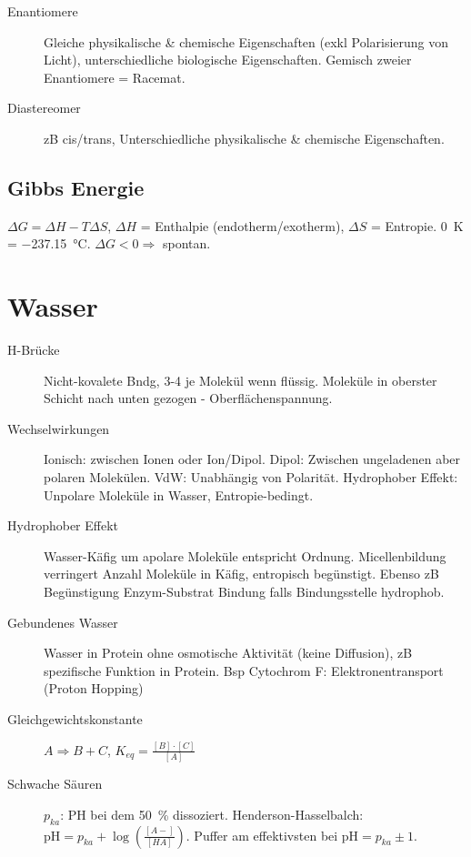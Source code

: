 \documentclass[a4paper,twocolumn,usegeometry,english,fontsize=6,DIV=16]{scrartcl}
\begin{document}
\begin{description}
	\item[Enantiomere] Gleiche physikalische \& chemische Eigenschaften
		(exkl Polarisierung von Licht), unterschiedliche biologische
		Eigenschaften. Gemisch zweier Enantiomere = Racemat.
	\item[Diastereomer] zB cis/trans, Unterschiedliche physikalische \&
		chemische Eigenschaften.
\end{description}

\subsection{Gibbs Energie}

$\Delta G = \Delta H - T \Delta S$, $\Delta H$ = Enthalpie
(endotherm/exotherm), $\Delta S$ = Entropie. \SI{0}{\kelvin} =
\SI{-237.15}{\celsius}. $\Delta G < 0 \Rightarrow$ spontan.

\section{Wasser}

\begin{description}
	\item[H-Brücke] Nicht-kovalete Bndg, 3-4 je  Molekül wenn
		flüssig. Moleküle in oberster Schicht nach unten gezogen -
		Oberflächenspannung.
	\item[Wechselwirkungen] Ionisch: zwischen Ionen oder Ion/Dipol. Dipol:
		Zwischen ungeladenen aber polaren Molekülen. VdW: Unabhängig
		von Polarität. Hydrophober Effekt: Unpolare Moleküle in Wasser,
		Entropie-bedingt.
	\item[Hydrophober Effekt] Wasser-Käfig um apolare Moleküle entspricht
		Ordnung. Micellenbildung verringert Anzahl Moleküle in Käfig,
		entropisch begünstigt. Ebenso zB Begünstigung Enzym-Substrat
		Bindung falls Bindungsstelle hydrophob.
	\item[Gebundenes Wasser] Wasser in Protein ohne osmotische Aktivität
		(keine Diffusion), zB spezifische Funktion in Protein. Bsp
		Cytochrom F: Elektronentransport (Proton Hopping)
	\item[Gleichgewichtskonstante] $A \Rightarrow B + C$, $K_{eq} =
		\frac{[B] \cdot [C]}{[A]}$
	\item[Schwache Säuren]  $p_{ka}$: PH bei dem \SI{50}{\percent}
		dissoziert. Henderson-Hasselbalch: $\text{pH} = p_{ka} +
		\log\left(\frac{[A-]}{[HA]}\right)$. Puffer am effektivsten bei
		$\text{pH} = p_{ka} \pm 1$.
\end{description}
\end{document}
